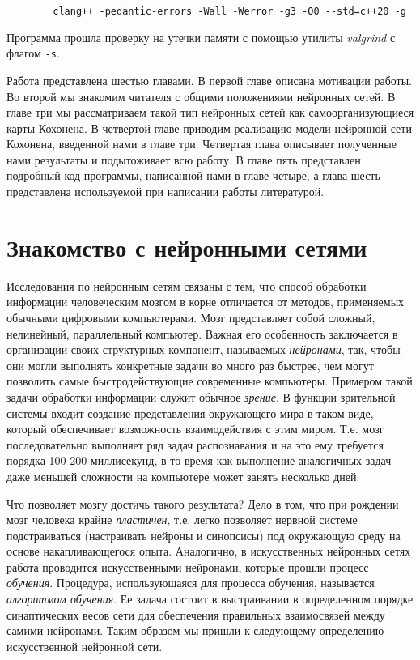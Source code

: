 \documentclass[a4paper,12pt]{report}
\begin{document}
\begin{verbatim}
        clang++ -pedantic-errors -Wall -Werror -g3 -O0 --std=c++20 -g
\end{verbatim}

Программа прошла проверку на утечки памяти с
помощью утилиты \textit{valgrind} с флагом \verb|-s|.

Работа
представлена шестью главами. В первой
главе описана
мотивации работы. Во второй мы знакомим читателя с общими положениями
нейронных сетей. В главе три
мы рассматриваем такой тип нейронных сетей как самоорганизующиеся карты Кохонена. В четвертой главе
приводим реализацию модели нейронной сети Кохонена, введенной нами в
главе три. Четвертая глава
описывает полученные нами результаты и подытоживает всю работу. В
главе пять представлен подробный код
программы, написанной нами в главе четыре, а глава шесть представлена используемой при написании работы литературой.

\section{Знакомство с нейронными сетями}
Исследования по нейронным сетям связаны с тем, что способ обработки
информации человеческим мозгом в корне отличается от методов,
применяемых обычными цифровыми компьютерами. Мозг представляет собой
сложный, нелинейный, параллельный компьютер. Важная его особенность
заключается в организации своих структурных компонент, называемых
\textit{нейронами}, так, чтобы они могли выполнять конкретные задачи
во много раз быстрее, чем могут позволить самые быстродействующие
современные компьютеры. Примером такой задачи обработки информации
служит обычное \textit{зрение}. В функции зрительной системы входит
создание представления окружающего мира в таком виде, который
обеспечивает возможность взаимодействия с этим миром. Т.е. мозг
последовательно выполняет ряд задач распознавания и на это ему
требуется порядка 100-200 миллисекунд, в то время как выполнение
аналогичных задач даже меньшей сложности на компьютере может занять
несколько дней.

Что позволяет мозгу достичь такого результата? Дело в том, что
при рождении мозг человека крайне \textit{пластичен}, т.е. легко позволяет
нервной системе подстраиваться (настраивать нейроны и синопсисы) под окружающую среду на основе
накапливающегося опыта. Аналогично, в искусственных нейронных сетях
работа проводится искусственными нейронами, которые прошли процесс
\textit{обучения}. Процедура, использующаяся для процесса обучения,
называется \textit{алгоритмом обучения}. Ее задача состоит в
выстраивании в определенном порядке синаптических весов сети для
обеспечения правильных взаимосвязей между самими нейронами. Таким
образом мы пришли к следующему определению искусственной нейронной
сети.
\end{document}
